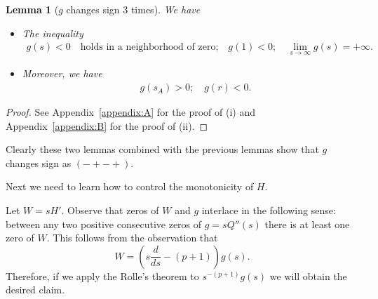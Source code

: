 \documentclass[11pt]{article}
\newtheorem{lemma}[theorem]{Lemma}
\theoremstyle{definition}
\newcommand{\1}{\mathbf{1}}
\begin{document}
\begin{lemma}[$g$ changes sign 3 times]\label{lem: g changes sign 3 times}We have 


\begin{itemize}
\item[\textup{(i)}]The inequality \begin{align*}
  g(s)<0 \quad \text{holds in a neighborhood of zero;} \quad g(1)<0; \quad \lim_{s \to \infty} g(s) = +\infty.  
\end{align*}
\item[\textup{(ii)}]Moreover, we have\begin{align*}
 \quad g(s_{A})>0; \quad  g(r)<0.  
\end{align*}
\end{itemize}
\end{lemma}
\begin{proof}
 See Appendix~\ref{appendix:A} for the proof of {(i)} and Appendix~\ref{appendix:B} for the proof of {(ii)}.
\end{proof}






  

Clearly these two lemmas combined with the previous lemmas show that $g$ changes sign as $(-+-+)$. 


\vskip0.3cm 



Next we need to learn how to control the monotonicity of $H$. 

\vskip0.3cm 




Let $W= sH'$. Observe that zeros of $W$ and $g$ interlace in the following sense:  between any two positive consecutive  zeros of $g=sQ''(s)$ there is at least one zero of $W$.  This follows from the observation that
$$
W = \left(s\frac{d}{ds}-(p+1)\right)g(s).
$$
Therefore, if we apply the Rolle's theorem to $s^{-(p+1)}g(s)$ we will obtain the desired claim. 
\end{document}

